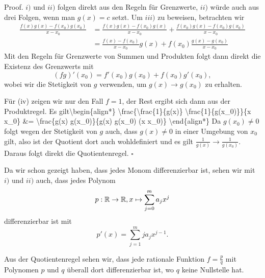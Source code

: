 \begin{emphBox}{}{}
Proof. \(i)\) und \(ii)\) folgen direkt aus den Regeln für Grenzwerte, \(ii)\) würde auch aus drei Folgen, wenn man \(g(x) =c\) setzt. Um \(iii)\) zu beweisen, betrachten wir
\begin{align*} \frac{f(x)g(x) - f(x_0)g(x_0)}{x-x_0} &= \frac{f(x)g(x) - f(x_0)g(x)}{x-x_0} + \frac{f(x_0)g(x) - f(x_0)g(x_0)}{x-x_0} \\
 &= \frac{f(x)  - f(x_0) }{x-x_0} g(x) + f(x_0) \frac{g(x) - g(x_0)}{x-x_0}
\end{align*}
Mit den Regeln für Grenzwerte von Summen und Produkten folgt dann direkt die Existenz des Grenzwerts mit
\begin{equation*}
 (fg)'(x_0) = f'(x_0) g(x_0) +  f(x_0) g'(x_0),
\end{equation*}
wobei wir die Stetigkeit von \(g\) verwenden, um \(g(x) \rightarrow g(x_0)\) zu erhalten.

Für (iv) zeigen wir nur den Fall \(f=1\), der Rest ergibt sich dann aus der Produktregel. Es gilt\textbackslash{}begin\{align*\}
\textbackslash{}frac\{\textbackslash{}frac\{1\}\{g(x)\}   \textbackslash{}frac\{1\}\{g(x\_0)\}\}\{x x\_0\} \&=   \textbackslash{}frac\{g(x)   g(x\_0)\}\{g(x) g(x\_0) (x x\_0)\} \textbackslash{}end\{align*\}
Da \(g(x_0) \neq 0\) folgt wegen der Stetigkeit von \(g\) auch, dass \(g(x) \neq 0\) in einer Umgebung von \(x_0\) gilt, also ist der Quotient dort auch wohldefiniert und es gilt \(\frac{1}{g(x)} \rightarrow \frac{1}{g(x_0)}\). Daraus folgt direkt die Quotientenregel. \(\square\)
\end{emphBox}
\label{differential/kombfkt:example-1}
\begin{example}{}{}



Da wir schon gezeigt haben, dass jedes Monom differenzierbar ist, sehen wir mit \(i)\) und \(ii)\) auch, dass jedes Polynom
\begin{equation*}
 p: \mathbb{R} \rightarrow \mathbb{R}, x \mapsto \sum_{j=0}^m a_j x^j
\end{equation*}
differenzierbar ist mit
\begin{equation*}
 p'(x) = \sum_{j=1}^m j a_j x^{j-1} .
\end{equation*}\end{example}
\label{differential/kombfkt:example-2}
\begin{example}{}{}



Aus der Quotientenregel sehen wir, dass jede rationale Funktion \(f= \frac{p}q\) mit Polynomen \(p\) und \(q\) überall dort differenzierbar ist, wo \(q\) keine Nullstelle hat.
\end{example}

